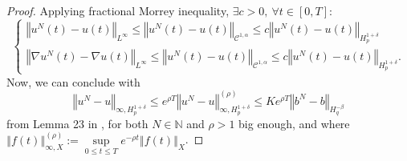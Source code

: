 \documentclass[12pt]{article}
\newcommand{\norme}[1]{\left\Vert #1\right\Vert}
\newcommand{\N}{\mathbb{N}}
\begin{document}
    \begin{proof}
        Applying fractional Morrey inequality, $\exists c>0,\ \forall t\in[0,T]$:
        \begin{equation*}
        \begin{cases}
        \norme{u^N(t) - u(t)}_{L^\infty}\leq\norme{u^N(t) - u(t)}_{\mathcal{C}^{1,\alpha}}\leq c\norme{u^N(t)-u(t)}_{H^{1+\delta}_{p}}\\        
        \norme{\nabla u^N(t) - \nabla u(t)}_{L^\infty}\leq\norme{u^N(t) - u(t)}_{\mathcal{C}^{1,\alpha}}\leq c\norme{u^N(t)-u(t)}_{H^{1+\delta}_{p}}.
        \end{cases}        
        \end{equation*}        
        Now, we can conclude with
        \begin{equation*}
        \norme{u^N-u}_{\infty,H^{1+\delta}_{p}}\leq e^{\rho T} \norme{u^N-u}_{\infty,H^{1+\delta}_{p}}^{(\rho)}\leq Ke^{\rho T}\norme{b^N-b}_{H^{-\beta}_{q}}
        \end{equation*} from Lemma 23 in \cite{Fla-Iss-Rus-2017}, for both $N\in\N$ and $\rho>1$ big enough, and where $\norme{f(t)}_{\infty,X}^{(\rho)} := \underset{0\leq t\leq T}{\sup} e^{-\rho t} \norme{f(t)}_X$.
    \end{proof}
        
\end{document}
